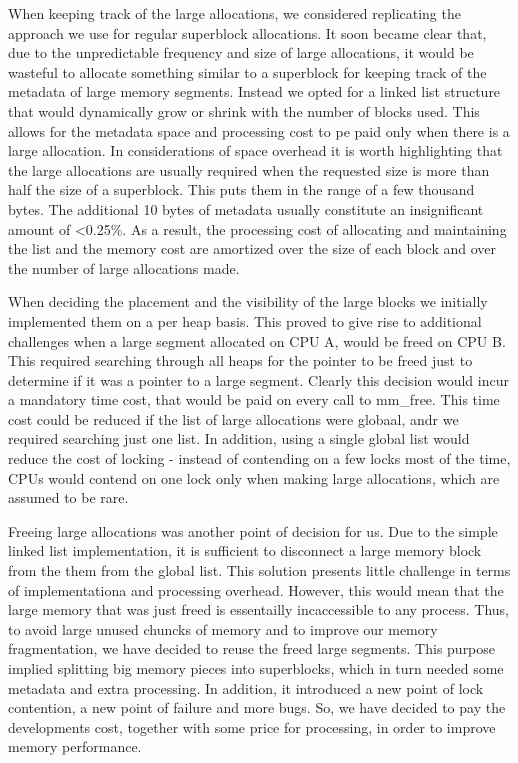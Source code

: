 \documentclass{article}
\begin{document}
When keeping track of the large allocations, we considered replicating the
approach we use for regular superblock allocations. It soon became clear that, 
due to the unpredictable frequency and size of large allocations, it would be 
wasteful to allocate something similar to a superblock for keeping track of the
metadata of large memory segments. Instead we opted for a linked list structure
that would dynamically grow or shrink with the number of blocks used. This 
allows for the metadata space and processing cost to pe paid only when there 
is a large allocation. In considerations of space overhead it is worth 
highlighting that the large allocations are usually required when the requested 
size is more than half the size of a superblock. This puts them in the range of 
a few thousand bytes. The additional 10 bytes of metadata usually constitute an 
insignificant amount of \textless 0.25\%. As a result, the processing cost of
allocating and maintaining the list and the memory cost are amortized over the 
size of each block and over the number of large allocations made.

When deciding the placement and the visibility of the large blocks we initially
implemented them on a per heap basis. This proved to give rise to additional
challenges when a large segment allocated on CPU A, would be freed on CPU B.
This required searching through all heaps for the pointer to be freed just to 
determine if it was a pointer to a large segment. Clearly this decision would 
incur a mandatory time cost, that would be paid on every call to mm\_free. 
This time cost could be reduced if the list of large allocations were globaal, 
andr we required searching just one list. In addition, using a single global
list would reduce the cost of locking - instead of contending on a few locks 
most of the time, CPUs would contend on one lock only when making large 
allocations, which are assumed to be rare.

Freeing large allocations was another point of decision for us. Due to the
simple linked list implementation, it is sufficient to disconnect a large 
memory block from the them from the global list. This solution presents 
little challenge in terms of implementationa and processing overhead. 
However, this would mean that the large memory that was just freed is
essentailly incaccessible to any process. Thus, to avoid large unused chuncks
of memory and to improve our memory fragmentation, we have decided to 
reuse the freed large segments. This purpose implied splitting big memory 
pieces into superblocks, which in turn needed some metadata and extra 
processing. In addition, it introduced a new point of lock contention, a new 
point of failure and more bugs. So, we have decided to pay the developments 
cost, together with some price for processing, in order to improve memory
performance.
\end{document}
